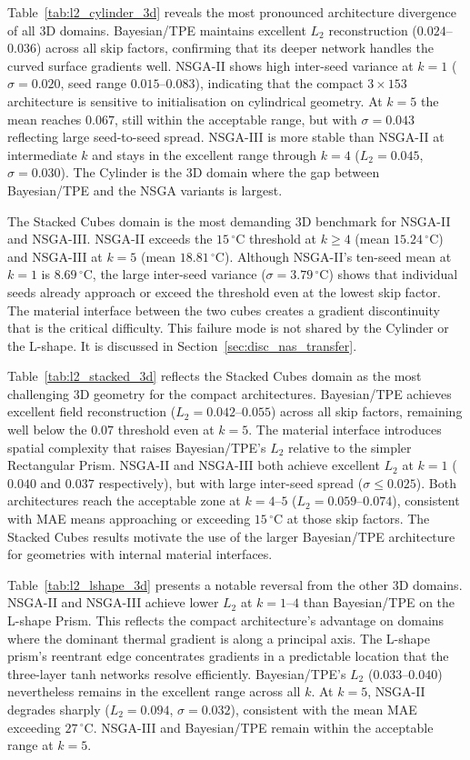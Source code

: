 Table~\ref{tab:l2_cylinder_3d} reveals the most pronounced architecture
divergence of all 3D domains. Bayesian/TPE maintains excellent $L_2$
reconstruction ($0.024$--$0.036$) across all skip factors, confirming that its
deeper network handles the curved surface gradients well. NSGA-II shows high
inter-seed variance at $k=1$ ($\sigma=0.020$, seed range $0.015$--$0.083$),
indicating that the compact $3{\times}153$ architecture is sensitive to
initialisation on cylindrical geometry. At $k=5$ the mean reaches $0.067$,
still within the acceptable range, but with $\sigma=0.043$ reflecting large
seed-to-seed spread. NSGA-III is more stable than NSGA-II at intermediate $k$
and stays in the excellent range through $k=4$ ($L_2=0.045$, $\sigma=0.030$).
The Cylinder is the 3D domain where the gap between Bayesian/TPE and the NSGA
variants is largest.


The Stacked Cubes domain is the most demanding 3D benchmark for NSGA-II and
NSGA-III. NSGA-II exceeds the $15\,^\circ\mathrm{C}$ threshold at $k\geq4$
(mean $15.24\,^\circ\mathrm{C}$) and NSGA-III at $k=5$ (mean
$18.81\,^\circ\mathrm{C}$). Although NSGA-II's ten-seed mean at $k=1$ is
$8.69\,^\circ\mathrm{C}$, the large inter-seed variance ($\sigma=3.79\,^\circ\mathrm{C}$)
shows that individual seeds already approach or exceed the threshold even
at the lowest skip factor. The material interface between the two cubes
creates a gradient discontinuity that is the critical difficulty. This failure
mode is not shared by the Cylinder or the L-shape. It is discussed in
Section~\ref{sec:disc_nas_transfer}.

Table~\ref{tab:l2_stacked_3d} reflects the Stacked Cubes domain as the most
challenging 3D geometry for the compact architectures. Bayesian/TPE achieves
excellent field reconstruction ($L_2 = 0.042$--$0.055$) across all skip
factors, remaining well below the $0.07$ threshold even at $k=5$. The
material interface introduces spatial complexity that raises Bayesian/TPE's
$L_2$ relative to the simpler Rectangular Prism. NSGA-II and NSGA-III both
achieve excellent $L_2$ at $k=1$ ($0.040$ and $0.037$ respectively), but with
large inter-seed spread ($\sigma \leq 0.025$). Both architectures reach the
acceptable zone at $k=4$--$5$ ($L_2 = 0.059$--$0.074$), consistent with MAE
means approaching or exceeding $15\,^\circ\mathrm{C}$ at those skip factors.
The Stacked Cubes results motivate the use of the larger Bayesian/TPE
architecture for geometries with internal material interfaces.


Table~\ref{tab:l2_lshape_3d} presents a notable reversal from the other 3D
domains. NSGA-II and NSGA-III achieve lower $L_2$ at $k=1$--$4$ than
Bayesian/TPE on the L-shape Prism. This reflects the compact architecture's
advantage on domains where the dominant thermal gradient is along a principal
axis. The L-shape prism's reentrant edge concentrates gradients in a
predictable location that the three-layer tanh networks resolve efficiently.
Bayesian/TPE's $L_2$ ($0.033$--$0.040$) nevertheless remains in the excellent
range across all $k$. At $k=5$, NSGA-II degrades sharply ($L_2=0.094$,
$\sigma=0.032$), consistent with the mean MAE exceeding $27\,^\circ\mathrm{C}$.
NSGA-III and Bayesian/TPE remain within the acceptable range at $k=5$.


